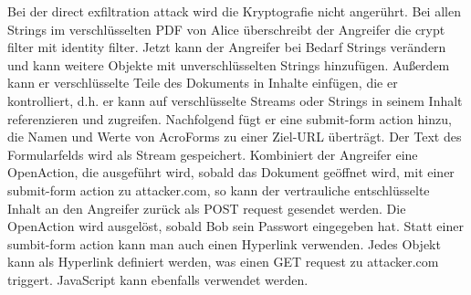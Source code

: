 \par
Bei der direct exfiltration attack wird die Kryptografie nicht angerührt. Bei allen Strings im verschlüsselten PDF von Alice überschreibt der Angreifer die crypt filter mit identity filter. Jetzt kann der Angreifer bei Bedarf Strings verändern und kann weitere Objekte mit unverschlüsselten Strings hinzufügen. Außerdem kann er verschlüsselte Teile des Dokuments in Inhalte einfügen, die er kontrolliert, d.h. er kann auf verschlüsselte Streams oder Strings in seinem Inhalt referenzieren und zugreifen. Nachfolgend fügt er eine submit-form action hinzu, die Namen und Werte von AcroForms zu einer Ziel-URL überträgt. Der Text des Formularfelds wird als Stream gespeichert. Kombiniert der Angreifer eine OpenAction, die ausgeführt wird, sobald das Dokument geöffnet wird, mit einer submit-form action zu attacker.com, so kann der vertrauliche entschlüsselte Inhalt an den Angreifer zurück als POST request gesendet werden. Die OpenAction wird ausgelöst, sobald Bob sein Passwort eingegeben hat. Statt einer sumbit-form action kann man auch einen Hyperlink verwenden. Jedes Objekt kann als Hyperlink definiert werden, was einen GET request zu attacker.com triggert. JavaScript kann ebenfalls verwendet werden. \cite{ccc-break-pdf, pdfex}
\par
